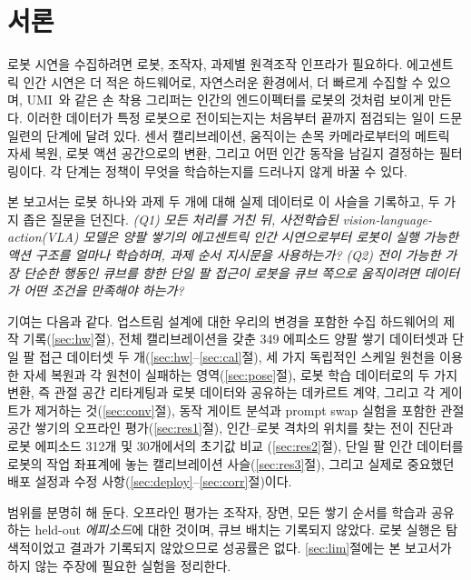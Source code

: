 \documentclass[conference,10pt]{IEEEtran}
\begin{document}
\section{서론}\label{sec:intro}
로봇 시연을 수집하려면 로봇, 조작자, 과제별 원격조작 인프라가 필요하다. 에고센트릭 인간 시연은 더 적은 하드웨어로, 자연스러운
환경에서, 더 빠르게 수집할 수 있으며, UMI~\cite{chi2024umi}와 같은 손 착용 그리퍼는 인간의 엔드이펙터를 로봇의 것처럼 보이게 만든다.
이러한 데이터가 특정 로봇으로 전이되는지는 처음부터 끝까지 점검되는 일이 드문 일련의 단계에 달려 있다. 센서 캘리브레이션, 움직이는
손목 카메라로부터의 메트릭 자세 복원, 로봇 액션 공간으로의 변환, 그리고 어떤 인간 동작을 남길지 결정하는 필터링이다. 각 단계는
정책이 무엇을 학습하는지를 드러나지 않게 바꿀 수 있다.

본 보고서는 로봇 하나와 과제 두 개에 대해 실제 데이터로 이 사슬을 기록하고, 두 가지 좁은 질문을 던진다. \emph{(Q1) 모든 처리를
거친 뒤, 사전학습된 vision-language-action(VLA) 모델은 양팔 쌓기의 에고센트릭 인간 시연으로부터 로봇이 실행 가능한 액션 구조를 얼마나
학습하며, 과제 순서 지시문을 사용하는가? (Q2) 전이 가능한 가장 단순한 행동인 큐브를 향한 단일 팔 접근이 로봇을 큐브 쪽으로
움직이려면 데이터가 어떤 조건을 만족해야 하는가?}

기여는 다음과 같다. 업스트림 설계에 대한 우리의 변경을 포함한 수집 하드웨어의 제작 기록(\ref{sec:hw}절), 전체 캘리브레이션을 갖춘
349 에피소드 양팔 쌓기 데이터셋과 단일 팔 접근 데이터셋 두 개(\ref{sec:hw}--\ref{sec:cal}절), 세 가지 독립적인 스케일 원천을 이용한
자세 복원과 각 원천이 실패하는 영역(\ref{sec:pose}절), 로봇 학습 데이터로의 두 가지 변환, 즉 관절 공간 리타게팅과 로봇 데이터와
공유하는 데카르트 계약, 그리고 각 게이트가 제거하는 것(\ref{sec:conv}절), 동작 게이트 분석과 prompt swap 실험을 포함한 관절 공간 쌓기의
오프라인 평가(\ref{sec:res1}절), 인간--로봇 격차의 위치를 찾는 전이 진단과 로봇 에피소드 312개 및 30개에서의 초기값 비교
(\ref{sec:res2}절), 단일 팔 인간 데이터를 로봇의 작업 좌표계에 놓는 캘리브레이션 사슬(\ref{sec:res3}절), 그리고 실제로 중요했던 배포
설정과 수정 사항(\ref{sec:deploy}--\ref{sec:corr}절)이다.

범위를 분명히 해 둔다. 오프라인 평가는 조작자, 장면, 모든 쌓기 순서를 학습과 공유하는 held-out \emph{에피소드}에 대한 것이며, 큐브
배치는 기록되지 않았다. 로봇 실행은 탐색적이었고 결과가 기록되지 않았으므로 성공률은 없다. \ref{sec:lim}절에는 본 보고서가 하지 않는
주장에 필요한 실험을 정리한다.
\end{document}
